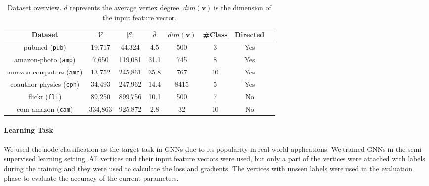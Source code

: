 \begin{table}
    \centering
    \begin{tabular}{cccccccc}
        \toprule
        Dataset                                                 & $|\mathcal{V}|$ & $|\mathcal{E}|$ & $\bar{d}$ & $dim(\boldsymbol{v})$ & \#Class & Directed \\
        \midrule
        pubmed (\texttt{pub}) \cite{yang2016_revisiting_semisupervised}  & 19,717          & 44,324          & 4.5       & 500                   & 3       & Yes      \\
        amazon-photo (\texttt{amp}) \cite{shchur2018_pitfall_of_gnn}     & 7,650           & 119,081         & 31.1      & 745                   & 8       & Yes      \\
        amazon-computers (\texttt{amc}) \cite{shchur2018_pitfall_of_gnn} & 13,752          & 245,861         & 35.8      & 767                   & 10      & Yes      \\
        coauthor-physics (\texttt{cph}) \cite{shchur2018_pitfall_of_gnn} & 34,493          & 247,962         & 14.4      & 8415                  & 5       & Yes      \\
        flickr (\texttt{fli}) \cite{zeng2020_graphsaint}                 & 89,250          & 899,756         & 10.1      & 500                   & 7       & No       \\
        com-amazon (\texttt{cam}) \cite{yang2012_defining}               & 334,863         & 925,872         & 2.8       & 32                    & 10      & No       \\
        \bottomrule
    \end{tabular}
    \caption{Dataset overview. $\bar{d}$ represents the average vertex degree. $dim(\boldsymbol{v})$ is the dimension of the input feature vector.}
    \label{tab:dataset_overview}
\end{table}

\paragraph{Learning Task}
We used the node classification as the target task in GNNs due to its popularity in real-world applications.
We trained GNNs in the semi-supervised learning setting.
All vertices and their input feature vectors were used, but only a part of the vertices were attached with labels during the training and they were used to calculate the loss and gradients.
The vertices with unseen labels were used in the evaluation phase to evaluate the accuracy of the current parameters.

